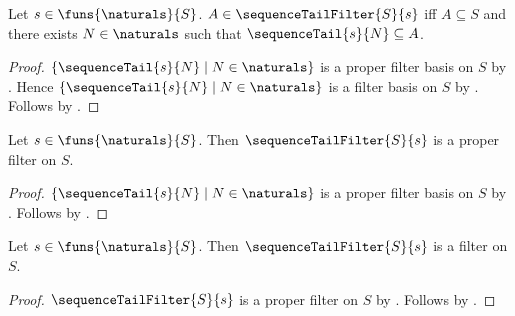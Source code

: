 \begin{proposition}\label{sequence_tail_filter_iff}
    Let $s\in\funs{\naturals}{S}$.
    $A\in\sequenceTailFilter{S}{s}$ iff
        $A\subseteq S$ and there exists $N\in\naturals$ such that
            $\sequenceTail{s}{N}\subseteq A$.
\end{proposition}
\begin{proof}
    $\{\sequenceTail{s}{N}\mid N\in\naturals\}$
        is a proper filter basis on $S$ by
        .
    Hence $\{\sequenceTail{s}{N}\mid N\in\naturals\}$
        is a filter basis on $S$ by
        .
    Follows by
        .
\end{proof}

\begin{theorem}\label{sequence_tail_filter_is_proper_filter}
    Let $s\in\funs{\naturals}{S}$.
    Then $\sequenceTailFilter{S}{s}$ is a proper filter on $S$.
\end{theorem}
\begin{proof}
    $\{\sequenceTail{s}{N}\mid N\in\naturals\}$
        is a proper filter basis on $S$
        by .
    Follows by
        .
\end{proof}

\begin{classification}\label{sequence_tail_filter_is_filter}
    Let $s\in\funs{\naturals}{S}$.
    Then $\sequenceTailFilter{S}{s}$ is a filter on $S$.
\end{classification}
\begin{proof}
    $\sequenceTailFilter{S}{s}$ is a proper filter on $S$
        by .
    Follows by .
\end{proof}

